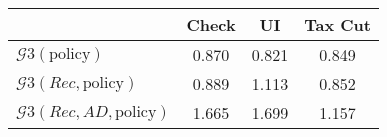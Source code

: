 \begin{tabular}{@{}lccc@{}} 
\toprule 
                          & Check      & UI    & Tax Cut    \\  \midrule 
$\mathcal{G}3(\text{policy})$ & 0.870  & 0.821  & 0.849     \\ 
$\mathcal{G}3(Rec,\text{policy})$ & 0.889  & 1.113  & 0.852     \\ 
$\mathcal{G}3(Rec, AD,\text{policy})$ & 1.665  & 1.699  & 1.157     \\ 
\end{tabular}  
